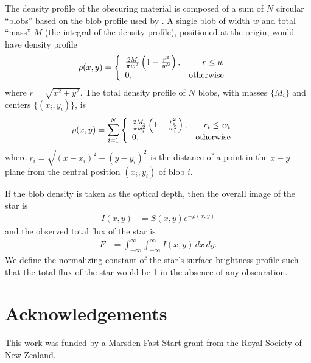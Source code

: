 \documentclass[a4paper,fleqn,usenatbib]{mnras}
\begin{document}
The density profile of the obscuring material is composed of a sum of
$N$ circular ``blobs'' based on the blob profile
used by \citet{lensing2}. A single blob of width $w$ and total ``mass'' $M$
(the integral of the density profile),
positioned at the origin, would have density profile
\begin{align}
\rho(x, y) &= \left\{
        \begin{array}{lr}
            \frac{2M}{\pi w^2}\left(1 - \frac{r^2}{w^2}\right), & r \leq w\\
            0, & \textnormal{otherwise}
        \end{array}\right.
\end{align}
where $r = \sqrt{x^2 + y^2}$. The total density profile of $N$ blobs,
with masses $\{M_i\}$ and centers $\{(x_i, y_i)\}$, is
\begin{align}
\rho(x, y) &= \sum_{i=1}^N
        \left\{
        \begin{array}{lr}
            \frac{2M_i}{\pi w_i^2}
                \left(1 - \frac{r_i^2}{w_i^2}\right), & r_i \leq w_i\\
            0, & \textnormal{otherwise}
        \end{array}\right.
\end{align}
where $r_i = \sqrt{(x - x_i)^2 + (y - y_i)^2}$ is the distance of a point
in the $x-y$ plane from the central position $(x_i, y_i)$ of blob $i$.

If the blob density is taken as the optical depth, then the overall image
of the star is
\begin{align}
I(x, y) &= S(x, y)e^{-\rho(x,y)}
\end{align}
and the observed total flux of the star is
\begin{align}
F &= \int_{-\infty}^{\infty}\int_{-\infty}^{\infty}
        I(x, y) \, dx \, dy.
\end{align}
We define the normalizing constant of the star's surface brightness profile
such that the total flux of the star would be 1 in the absence of any
obscuration.

\section*{Acknowledgements}
This work was funded by a Marsden Fast Start grant from the Royal Society of
New Zealand.


\end{document}
